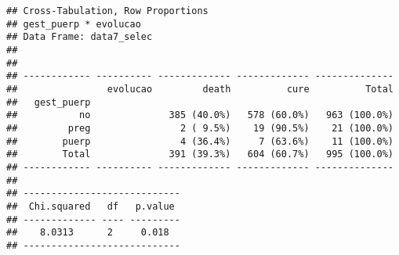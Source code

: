 \documentclass[
]{article}
\newenvironment{Shaded}{\begin{snugshade}}{\end{snugshade}}
\newcommand{\DataTypeTok}[1]{\textcolor[rgb]{0.13,0.29,0.53}{#1}}
\newcommand{\KeywordTok}[1]{\textcolor[rgb]{0.13,0.29,0.53}{\textbf{#1}}}
\newcommand{\NormalTok}[1]{#1}
\newcommand{\OperatorTok}[1]{\textcolor[rgb]{0.81,0.36,0.00}{\textbf{#1}}}
\newcommand{\OtherTok}[1]{\textcolor[rgb]{0.56,0.35,0.01}{#1}}
\newcommand{\StringTok}[1]{\textcolor[rgb]{0.31,0.60,0.02}{#1}}
\begin{document}
\begin{Shaded}
\end{Shaded}

\begin{Shaded}
\end{Shaded}

\begin{verbatim}
## Cross-Tabulation, Row Proportions  
## gest_puerp * evolucao  
## Data Frame: data7_selec  
## 
## 
## ------------ ---------- ------------- ------------- --------------
##                evolucao         death          cure          Total
##   gest_puerp                                                      
##           no              385 (40.0%)   578 (60.0%)   963 (100.0%)
##         preg                2 ( 9.5%)    19 (90.5%)    21 (100.0%)
##        puerp                4 (36.4%)     7 (63.6%)    11 (100.0%)
##        Total              391 (39.3%)   604 (60.7%)   995 (100.0%)
## ------------ ---------- ------------- ------------- --------------
## 
## ----------------------------
##  Chi.squared   df   p.value 
## ------------- ---- ---------
##    8.0313      2     0.018  
## ----------------------------
\end{verbatim}

\begin{Shaded}
\end{Shaded}
\end{document}
